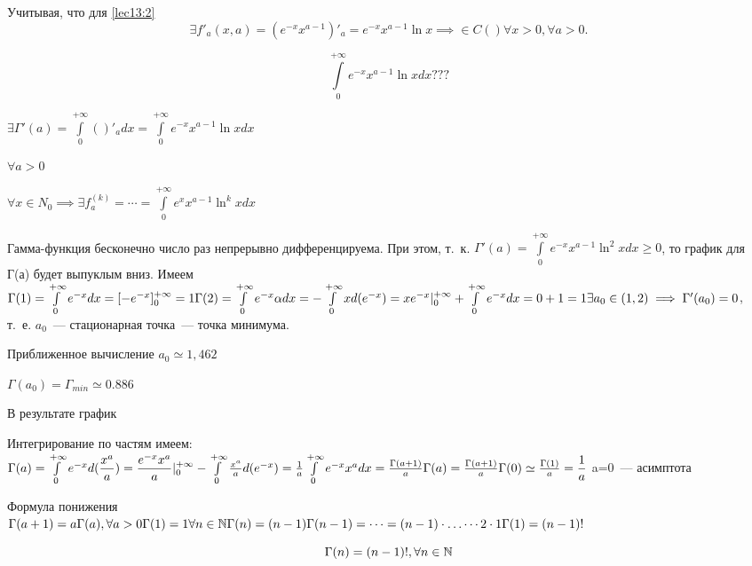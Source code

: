 \documentclass[../../main.tex]{subfiles}
\begin{document}
Учитывая, что для \eqref{lec13:2}
\[
\exists f'_a(x, a) = (e^{-x} x^{a-1})'_a = e^{-x}x^{a-1} \ln x \implies \in 
C() \forall x > 0, \forall a > 0.
\]

\[
\int\limits_0^{+\infty} e^{-x} x^{a-1} \ln x dx ???
\]

$
\exists \Gamma'(a) = \int\limits_0^{+\infty} ()'_a dx = 
\int\limits_0^{+\infty} 
e^{-x} x^{a-1} \ln x dx 
$

$\forall a > 0$

$
\forall x \in N_0 \implies \exists f^{(k)}_a = \cdots = 
\int\limits_0^{+\infty} e^x x^{a-1} \ln^k x dx 
$

Гамма-функция бесконечно число раз непрерывно дифференцируема.
При этом, т.~к. $\Gamma'(a) = \int\limits_0^{+\infty} e^{-x} x^{a-1} \ln^2 x 
dx \ge 
0$,
то график для Г(а) будет выпуклым вниз. Имеем
$
\Gamma(1) = \int\limits_0^{+\infty} e^{-x} dx = [-e^{-x}]^{+\infty}_0 = 1
\\
\Gamma(2) = \int\limits_0^{+\infty} e^{-x} \alpha dx = 
- \int\limits_0^{+\infty} x d(e^{-x}) = 
xe^{-x}|^{+\infty}_0 + \int\limits_0^{+\infty} e^{-x} dx = 
0 + 1 = 1
\\
\exists a_0 \in (1, 2) \implies \Gamma'(a_0) = 0$, т.~е. $a_0$~--- 
стационарная 
точка~--- точка минимума.

Приближенное вычисление $a_0 \simeq 1,462$

$\Gamma(a_0) = \Gamma_{min} \simeq 0.886$

В результате график

Интегрирование по частям имеем:
$
\Gamma(a) = \int\limits_0^{+\infty} e^{-x} d(\dfrac{x^a}{a}) =
 \dfrac{e^{-x}x^a}{a} |^{+\infty}_0 - \int\limits_0^{+\infty} \frac{x^a}{a} 
 d(e^{-x}) = 
 \frac{1}{a} \int\limits_0^{+\infty} e^{-x} x^a dx = \frac{\Gamma(a+1)}{a}
\\
\Gamma(a) = \frac{\Gamma(a+1)}{a}
\\
\Gamma(0) \simeq \frac{\Gamma(1)}{a} = \dfrac{1}{a}
$
a=0~--- асимптота

Формула понижения
\\
$
\Gamma(a+1) = a\Gamma(a), \forall a > 0
\\
\Gamma(1) = 1
\\
\forall n \in \mathbb{N}
\\
\Gamma(n) = (n-1)\Gamma(n-1) = \cdots = (n-1) \cdot \ldots \cdots 2 \cdot 1 
\Gamma(1) = (n-1)!
$

\begin{equation}
\label{lec13:4}
\Gamma(n) = (n-1)!,  \forall n \in \mathbb{N}
\end{equation}
\end{document}
